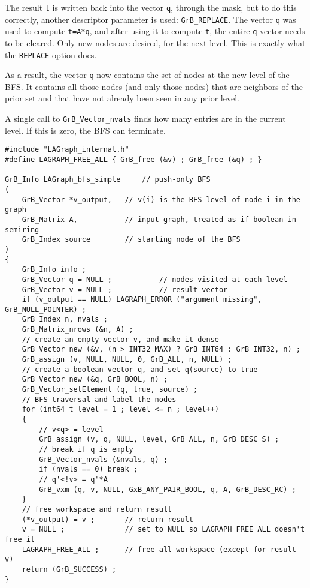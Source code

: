 \documentclass[12pt]{article}
\begin{document}
The result \verb't' is written back into the vector \verb'q', through the mask,
but to do this correctly, another descriptor parameter is used:
\verb'GrB_REPLACE'.  The vector \verb'q' was used to compute \verb't=A*q', and
after using it to compute \verb't', the entire \verb'q' vector needs to be
cleared.  Only new nodes are desired, for the next level.  This is exactly what
the \verb'REPLACE' option does.

As a result, the vector \verb'q' now contains the set of nodes at the new
level of the BFS.  It contains all those nodes (and only those nodes)
that are neighbors of the prior set and that have not already been seen in
any prior level.

A single call to \verb'GrB_Vector_nvals' finds how many entries are in the
current level.  If this is zero, the BFS can terminate.

\newpage
\begin{mdframed}[userdefinedwidth=6in]
{\footnotesize
\begin{verbatim}
#include "LAGraph_internal.h"
#define LAGRAPH_FREE_ALL { GrB_free (&v) ; GrB_free (&q) ; }

GrB_Info LAGraph_bfs_simple     // push-only BFS
(
    GrB_Vector *v_output,   // v(i) is the BFS level of node i in the graph
    GrB_Matrix A,           // input graph, treated as if boolean in semiring
    GrB_Index source        // starting node of the BFS
)
{
    GrB_Info info ;
    GrB_Vector q = NULL ;           // nodes visited at each level
    GrB_Vector v = NULL ;           // result vector
    if (v_output == NULL) LAGRAPH_ERROR ("argument missing", GrB_NULL_POINTER) ;
    GrB_Index n, nvals ;
    GrB_Matrix_nrows (&n, A) ;
    // create an empty vector v, and make it dense
    GrB_Vector_new (&v, (n > INT32_MAX) ? GrB_INT64 : GrB_INT32, n) ;
    GrB_assign (v, NULL, NULL, 0, GrB_ALL, n, NULL) ;
    // create a boolean vector q, and set q(source) to true
    GrB_Vector_new (&q, GrB_BOOL, n) ;
    GrB_Vector_setElement (q, true, source) ;
    // BFS traversal and label the nodes
    for (int64_t level = 1 ; level <= n ; level++)
    {
        // v<q> = level
        GrB_assign (v, q, NULL, level, GrB_ALL, n, GrB_DESC_S) ;
        // break if q is empty
        GrB_Vector_nvals (&nvals, q) ;
        if (nvals == 0) break ;
        // q'<!v> = q'*A
        GrB_vxm (q, v, NULL, GxB_ANY_PAIR_BOOL, q, A, GrB_DESC_RC) ;
    }
    // free workspace and return result
    (*v_output) = v ;       // return result
    v = NULL ;              // set to NULL so LAGRAPH_FREE_ALL doesn't free it
    LAGRAPH_FREE_ALL ;      // free all workspace (except for result v)
    return (GrB_SUCCESS) ;
}
\end{verbatim}}
\end{mdframed}
\end{document}
